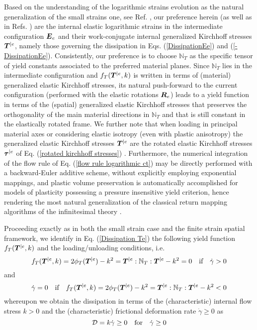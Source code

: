 \documentclass[preprint,review,12pt,sort&compress]{elsarticle}%
\renewcommand{\mathbf}[1]{\mbox{\boldmath $#1$ \unboldmath}  \!\!}
\begin{document}
Based on the understanding of the logarithmic strains evolution as the natural
generalization of the small strains one, see Ref. \cite{LatMonIJSS2014}, our
preference herein (as well as in Refs.
\cite{MontansBathe07,CamineroMontansBathe11}) are the internal elastic
logarithmic strains in the intermediate configuration $\mathbf{E}_{e}$ and
their work-conjugate internal generalized Kirchhoff stresses $\mathbf{T}^{|e}%
$, namely those governing the dissipation in Eqs. (\ref{DissipationEe}) and
(\ref{-DissipationEe}). Consistently, our preference is to choose
$\mathbb{N}_{T}$ as the specific tensor of yield constants associated to the
preferred material planes. Since $\mathbb{N}_{T}$ lies in the intermediate
configuration and $f_{T}(\mathbf{T}^{|e},k)$ is written in terms of (material)
generalized elastic Kirchhoff stresses, its natural push-forward to the
current configuration (performed with the elastic rotations $\mathbf{R}_{e}$)
leads to a yield function in terms of the (spatial) generalized elastic
Kirchhoff stresses that preserves the orthogonality of the main material
directions in $\mathbb{N}_{T}$ and that is still constant in the elastically
rotated frame. We further note that when loading in principal material axes or
considering elastic isotropy (even with plastic anisotropy) the generalized
elastic Kirchhoff stresses $\mathbf{T}^{|e}$ are the rotated elastic Kirchhoff
stresses $\mathbf{\tau}^{|e}$ of Eq. (\ref{rotated kirchhoff stresses})
\cite{LatMonAPM2016}. Furthermore, the numerical integration of the flow rule
of Eq. (\ref{flow rule logarithmic ct}) may be directly performed with a
backward-Euler additive scheme, without explicitly employing exponential
mappings, and plastic volume preservation is automatically accomplished for
models of plasticity possessing a pressure insensitive yield criterion, hence
rendering the most natural generalization of the classical return mapping
algorithms of the infinitesimal theory \cite{LatMonCM2015}.

Proceeding exactly as in both the small strain case and the finite strain
spatial framework, we identify in Eq. (\ref{Dissipation Te}) the following
yield function $f_{T}(\mathbf{T}^{|e},k)$ and the loading/unloading
conditions, i.e.%
\begin{equation}
f_{T}(\mathbf{T}^{|e},k)=2\phi_{T}(\mathbf{T}^{|e})-k^{2}=\mathbf{T}%
^{|e}:\mathbb{N}_{T}:\mathbf{T}^{|e}-k^{2}=0\quad\text{if}\quad\dot{\gamma}>0
\label{Yield fcn log}%
\end{equation}
and%
\begin{equation}
\dot{\gamma}=0\quad\text{if}\quad f_{T}(\mathbf{T}^{|e},k)=2\phi
_{T}(\mathbf{T}^{|e})-k^{2}=\mathbf{T}^{|e}:\mathbb{N}_{T}:\mathbf{T}%
^{|e}-k^{2}<0
\end{equation}
whereupon we obtain the dissipation in terms of the (characteristic) internal
flow stress $k>0$ and the (characteristic) frictional deformation rate
$\dot{\gamma}\geq0$ as%
\begin{equation}
\mathcal{D}=k\dot{\gamma}\geq0\text{\quad for\quad}\dot{\gamma}\geq0
\end{equation}
\end{document}
